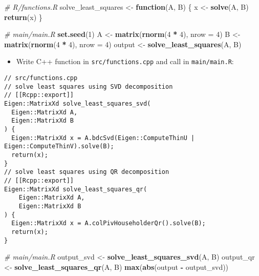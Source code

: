 \documentclass[
]{book}
\newenvironment{Shaded}{\begin{snugshade}}{\end{snugshade}}
\newcommand{\AttributeTok}[1]{\textcolor[rgb]{0.13,0.29,0.53}{#1}}
\newcommand{\CommentTok}[1]{\textcolor[rgb]{0.56,0.35,0.01}{\textit{#1}}}
\newcommand{\ControlFlowTok}[1]{\textcolor[rgb]{0.13,0.29,0.53}{\textbf{#1}}}
\newcommand{\DecValTok}[1]{\textcolor[rgb]{0.00,0.00,0.81}{#1}}
\newcommand{\FunctionTok}[1]{\textcolor[rgb]{0.13,0.29,0.53}{\textbf{#1}}}
\newcommand{\NormalTok}[1]{#1}
\newcommand{\OtherTok}[1]{\textcolor[rgb]{0.56,0.35,0.01}{#1}}
\newcommand{\SpecialCharTok}[1]{\textcolor[rgb]{0.81,0.36,0.00}{\textbf{#1}}}
\providecommand{\tightlist}{%
  \setlength{\itemsep}{0pt}\setlength{\parskip}{0pt}}
\begin{document}
\begin{Shaded}
\begin{Highlighting}[]
\CommentTok{\# R/functions.R}
\NormalTok{solve\_least\_squares }\OtherTok{\textless{}{-}}
  \ControlFlowTok{function}\NormalTok{(A, B) \{}
\NormalTok{    x }\OtherTok{\textless{}{-}} \FunctionTok{solve}\NormalTok{(A, B)}
    \FunctionTok{return}\NormalTok{(x)}
\NormalTok{  \}}
\end{Highlighting}
\end{Shaded}

\begin{Shaded}
\begin{Highlighting}[]
\CommentTok{\# main/main.R}
\FunctionTok{set.seed}\NormalTok{(}\DecValTok{1}\NormalTok{)}
\NormalTok{A }\OtherTok{\textless{}{-}} \FunctionTok{matrix}\NormalTok{(}\FunctionTok{rnorm}\NormalTok{(}\DecValTok{4} \SpecialCharTok{*} \DecValTok{4}\NormalTok{), }\AttributeTok{nrow =} \DecValTok{4}\NormalTok{)}
\NormalTok{B }\OtherTok{\textless{}{-}} \FunctionTok{matrix}\NormalTok{(}\FunctionTok{rnorm}\NormalTok{(}\DecValTok{4} \SpecialCharTok{*} \DecValTok{4}\NormalTok{), }\AttributeTok{nrow =} \DecValTok{4}\NormalTok{)}
\NormalTok{output }\OtherTok{\textless{}{-}} \FunctionTok{solve\_least\_squares}\NormalTok{(A, B)}
\end{Highlighting}
\end{Shaded}

\begin{itemize}
\tightlist
\item
  Write C++ function in \texttt{src/functions.cpp} and call in \texttt{main/main.R}:
\end{itemize}

\begin{verbatim}
// src/functions.cpp
// solve least squares using SVD decomposition
// [[Rcpp::export]]
Eigen::MatrixXd solve_least_squares_svd(
  Eigen::MatrixXd A,
  Eigen::MatrixXd B
) {
  Eigen::MatrixXd x = A.bdcSvd(Eigen::ComputeThinU | Eigen::ComputeThinV).solve(B);
  return(x);
}
// solve least squares using QR decomposition
// [[Rcpp::export]]
Eigen::MatrixXd solve_least_squares_qr(
    Eigen::MatrixXd A,
    Eigen::MatrixXd B
) {
  Eigen::MatrixXd x = A.colPivHouseholderQr().solve(B);
  return(x);
}
\end{verbatim}

\begin{Shaded}
\begin{Highlighting}[]
\CommentTok{\# main/main.R}
\NormalTok{output\_svd }\OtherTok{\textless{}{-}} \FunctionTok{solve\_least\_squares\_svd}\NormalTok{(A, B)}
\NormalTok{output\_qr }\OtherTok{\textless{}{-}} \FunctionTok{solve\_least\_squares\_qr}\NormalTok{(A, B)}
\FunctionTok{max}\NormalTok{(}\FunctionTok{abs}\NormalTok{(output }\SpecialCharTok{{-}}\NormalTok{ output\_svd))}
\end{Highlighting}
\end{Shaded}
\end{document}
